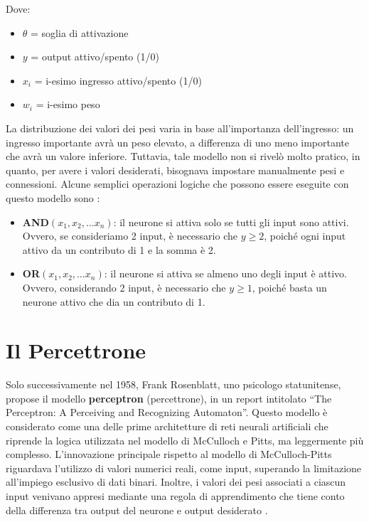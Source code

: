 \newpage
Dove:
\begin{itemize}
    \item $ \theta $ = soglia di attivazione
    \item $ y $ = output attivo/spento (1/0)
    \item $ x_i $ = i-esimo ingresso attivo/spento (1/0)
    \item $ w_i $ = i-esimo peso
\end{itemize}






La distribuzione dei valori dei pesi varia in  base all’importanza 
dell’ingresso: un ingresso importante avrà un peso elevato, a 
differenza di uno meno importante che avrà un valore inferiore. 
Tuttavia, tale modello non si rivelò molto pratico, in quanto, per avere i valori 
desiderati, bisognava impostare manualmente pesi e connessioni.
Alcune semplici operazioni logiche che possono essere eseguite con questo modello sono 
\cite{STORIA_PERCETTONE}:

\begin{itemize}
    \item \textbf{AND$(x_1, x_2,\dots x_n)$}: il neurone si attiva 
    solo se tutti gli input sono attivi. Ovvero, se consideriamo 2 
    input, è necessario che $y \ge 2 $, poiché ogni input attivo da un 
    contributo di 1 e la somma è 2.

    \item \textbf{OR$(x_1, x_2,\dots x_n)$}: il neurone si attiva se 
    almeno uno degli input è attivo. Ovvero, considerando 2 input, è 
    necessario che $y \ge 1 $, poiché basta un neurone attivo che dia un 
    contributo di 1.
 
\end{itemize}

\section{Il Percettrone}
Solo successivamente nel 1958, Frank Rosenblatt, uno psicologo statunitense, propose il
modello \textbf{perceptron} (percettrone), in un report intitolato “The Perceptron: A Perceiving and Recognizing Automaton”.
Questo modello è considerato come una delle prime architetture di reti neurali artificiali 
che riprende la logica utilizzata nel modello di McCulloch e Pitts, ma leggermente più complesso.
L’innovazione principale rispetto al modello di McCulloch-Pitts riguardava l'utilizzo di valori numerici reali, 
come input, superando la limitazione all'impiego esclusivo di dati binari. 
Inoltre, i valori dei pesi associati a ciascun input venivano appresi mediante una 
regola di apprendimento che 
tiene conto della differenza tra output del neurone e output desiderato
\cite{ASPETTI_APPRENDIMENTO_PERCETTONE,STORIA_PERCETTONE,ARTICOLO_PERCETTONE,
IMAMGINE_MODELLO_MAT_NEURONE_GENERALE_PERCETTONE}.

